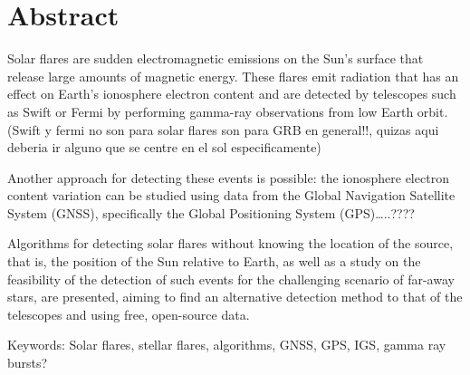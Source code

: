 \section{Abstract}

Solar flares are sudden electromagnetic emissions on the Sun’s surface that release large amounts of magnetic energy. These flares emit radiation that has an effect on Earth’s ionosphere electron content and are detected by telescopes such as Swift or Fermi by performing gamma-ray observations from low Earth orbit. (Swift y fermi no son para solar flares son para GRB en general!!, quizas aqui deberia ir alguno que se centre en el sol especificamente)

Another approach for detecting these events is possible: the ionosphere electron content variation can be studied using data from the Global Navigation Satellite System (GNSS), specifically the Global Positioning System (GPS)…..????

Algorithms for detecting solar flares without knowing the location of the source, that is, the position of the Sun relative to Earth, as well as a study on the feasibility of the detection of such events for the challenging scenario of far-away stars, are presented, aiming to find an alternative detection method to that of the telescopes and using free, open-source data.

Keywords: Solar flares, stellar flares, algorithms, GNSS, GPS, IGS, gamma ray bursts?